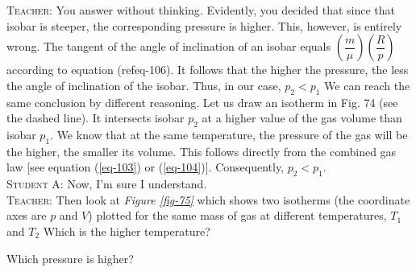 \documentclass[a4paper,sfsidenotes]{tufte-book}
\begin{document}
\textsc{Teacher:} You answer without thinking. Evidently, you decided that since that isobar is steeper, the corresponding pressure is higher. This, however, is entirely wrong. The tangent of the angle of inclination of an isobar equals  $\left( \dfrac{m}{\mu} \right) \left( \dfrac{R}{p} \right)$ according to equation (ref{eq-106}). It follows that the higher the pressure, the less the angle of inclination of the isobar. Thus, in our case, $p_{2} < p_{1}$ We can reach the same conclusion by different reasoning. Let us draw an isotherm in Fig. 74 (see the dashed line). It intersects isobar $p_{2}$ at a higher value of the gas volume than isobar $p_{1}$. We know that at the same temperature, the pressure of the gas will be the higher, the smaller its volume. This follows directly from the combined gas law [see equation (\ref{eq-103}) or (\ref{eq-104})]. Consequently,  $p_{2} < p_{1}$.
\\
\textsc{Student A:} Now, I'm sure I understand.
\\
\textsc{Teacher:} Then look at \emph{Figure \ref{fig-75}} which shows two isotherms (the coordinate axes are $p$ and $V$) plotted for the same mass of gas at different temperatures, $T_{1}$ and $T_{2}$ Which is the higher temperature?
\\
\begin{marginfigure}[-3cm]
\centering
\caption{Which pressure is higher?}
\label{fig-75}
\end{marginfigure}
\end{document}
